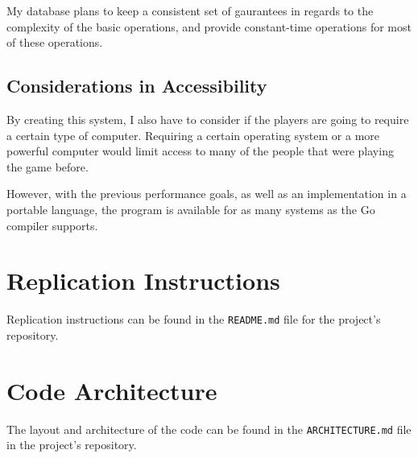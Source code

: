 \documentclass[10pt,twocolumn]{article}
\begin{document}
My database plans to keep a consistent set of gaurantees in regards to the
complexity of the basic operations, and provide constant-time operations for
most of these operations.

\subsection{Considerations in Accessibility}

By creating this system, I also have to consider if the players are going to
require a certain type of computer. Requiring a certain operating system or a
more powerful computer would limit access to many of the people that were
playing the game before.

However, with the previous performance goals, as well as an implementation in a
portable language, the program is available for as many systems as the Go
compiler supports.

\appendix

\section{Replication Instructions}

Replication instructions can be found in the \verb|README.md| file for the
project's repository.

\section{Code Architecture}

The layout and architecture of the code can be found in the
\verb|ARCHITECTURE.md| file in the project's repository.

\printbibliography
\end{document}
